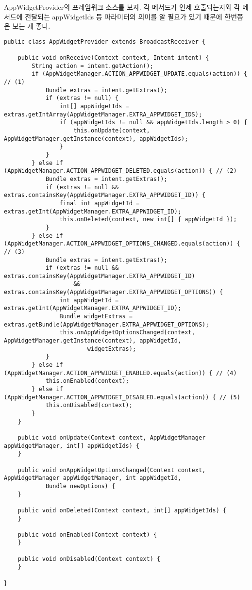 AppWidgetProvider의 프레임워크 소스를 보자. 각 메서드가 언제 호출되는지와 각 메서드에 전달되는 appWidgetIds 등 파라미터의 의미를 알 필요가 있기 때문에 한번쯤은 보는 게 좋다.
\begin{lstlisting}[frame=single, caption=AppWidgetProvider.java] 
public class AppWidgetProvider extends BroadcastReceiver {

	public void onReceive(Context context, Intent intent) {
		String action = intent.getAction();
		if (AppWidgetManager.ACTION_APPWIDGET_UPDATE.equals(action)) { // (1)
			Bundle extras = intent.getExtras();
			if (extras != null) {
				int[] appWidgetIds = extras.getIntArray(AppWidgetManager.EXTRA_APPWIDGET_IDS);
				if (appWidgetIds != null && appWidgetIds.length > 0) {
					this.onUpdate(context, AppWidgetManager.getInstance(context), appWidgetIds);
				}
			}
		} else if (AppWidgetManager.ACTION_APPWIDGET_DELETED.equals(action)) { // (2)
			Bundle extras = intent.getExtras();
			if (extras != null && extras.containsKey(AppWidgetManager.EXTRA_APPWIDGET_ID)) {
				final int appWidgetId = extras.getInt(AppWidgetManager.EXTRA_APPWIDGET_ID);
				this.onDeleted(context, new int[] { appWidgetId });
			}
		} else if (AppWidgetManager.ACTION_APPWIDGET_OPTIONS_CHANGED.equals(action)) { // (3)
			Bundle extras = intent.getExtras();
			if (extras != null && extras.containsKey(AppWidgetManager.EXTRA_APPWIDGET_ID)
					&& extras.containsKey(AppWidgetManager.EXTRA_APPWIDGET_OPTIONS)) {
				int appWidgetId = extras.getInt(AppWidgetManager.EXTRA_APPWIDGET_ID);
				Bundle widgetExtras = extras.getBundle(AppWidgetManager.EXTRA_APPWIDGET_OPTIONS);
				this.onAppWidgetOptionsChanged(context, AppWidgetManager.getInstance(context), appWidgetId, 
						widgetExtras);
			}
		} else if (AppWidgetManager.ACTION_APPWIDGET_ENABLED.equals(action)) { // (4)
			this.onEnabled(context);
		} else if (AppWidgetManager.ACTION_APPWIDGET_DISABLED.equals(action)) { // (5)
			this.onDisabled(context);
		}
	}

	public void onUpdate(Context context, AppWidgetManager appWidgetManager, int[] appWidgetIds) {
	}
	
	public void onAppWidgetOptionsChanged(Context context, AppWidgetManager appWidgetManager, int appWidgetId,
			Bundle newOptions) {
	}

	public void onDeleted(Context context, int[] appWidgetIds) {
	}

	public void onEnabled(Context context) {
	}

	public void onDisabled(Context context) {
	}
	
}
\end{lstlisting}

